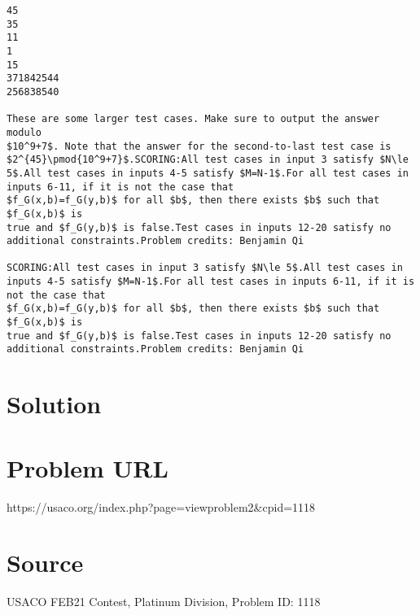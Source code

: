 \documentclass[12pt]{article}
\begin{document}
\begin{verbatim}
45
35
11
1
15
371842544
256838540

These are some larger test cases. Make sure to output the answer modulo
$10^9+7$. Note that the answer for the second-to-last test case is
$2^{45}\pmod{10^9+7}$.SCORING:All test cases in input 3 satisfy $N\le 5$.All test cases in inputs 4-5 satisfy $M=N-1$.For all test cases in inputs 6-11, if it is not the case that
$f_G(x,b)=f_G(y,b)$ for all $b$, then there exists $b$ such that $f_G(x,b)$ is
true and $f_G(y,b)$ is false.Test cases in inputs 12-20 satisfy no additional constraints.Problem credits: Benjamin Qi

SCORING:All test cases in input 3 satisfy $N\le 5$.All test cases in inputs 4-5 satisfy $M=N-1$.For all test cases in inputs 6-11, if it is not the case that
$f_G(x,b)=f_G(y,b)$ for all $b$, then there exists $b$ such that $f_G(x,b)$ is
true and $f_G(y,b)$ is false.Test cases in inputs 12-20 satisfy no additional constraints.Problem credits: Benjamin Qi
\end{verbatim}

\section*{Solution}


\section*{Problem URL}
https://usaco.org/index.php?page=viewproblem2&cpid=1118

\section*{Source}
USACO FEB21 Contest, Platinum Division, Problem ID: 1118
\end{document}
